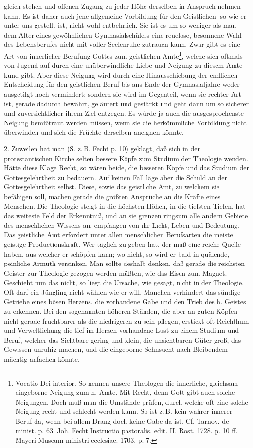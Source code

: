 gleich stehen und offenen Zugang zu jeder Höhe derselben in Anspruch nehmen kann. Es ist daher auch jene allgemeine Vorbildung für den Geistlichen, so wie er unter uns gestellt ist, nicht wohl entbehrlich. Sie ist es um so weniger als man dem Alter eines gewöhnlichen Gymnasialschülers eine reuelose, besonnene Wahl des Lebensberufes nicht mit voller Seelenruhe zutrauen kann. Zwar gibt es eine Art von innerlicher Berufung Gottes zum geistlichen Amte\footnote{Vocatio Dei interior. So nennen unsere Theologen die innerliche, gleichsam eingeborne Neigung zum h. Amte. Mit Recht, denn Gott gibt auch solche Neigungen. Doch muß man die Umstände prüfen, durch welche oft eine solche Neigung recht und schlecht werden kann. So ist z.\,B. kein wahrer innerer Beruf da, wenn bei allem Drang doch keine Gabe da ist. Cf. Tarnov. de minist. p. 63. Joh. Fecht Instructio pastoralis. edit. II. Rost. 1728. p. 10 ff. Mayeri Museum ministri ecclesiae. 1703. p. 7.}, welche sich oftmals von Jugend auf durch eine unüberwindliche Liebe und Neigung zu diesem Amte kund gibt. Aber diese Neigung wird durch eine Hinausschiebung der endlichen Entscheidung für den geistlichen Beruf bis ans Ende der Gymnasialjahre weder ausgetilgt noch vermindert; sondern sie wird im Gegenteil, wenn sie rechter Art ist, gerade dadurch bewährt, geläutert und gestärkt und geht dann um so sicherer und zuversichtlicher ihrem Ziel entgegen. Es würde ja auch die ausgesprochenste Neigung bemißtraut werden müssen, wenn sie die herkömmliche Vorbildung nicht überwinden und sich die Früchte derselben aneignen könnte.

2. Zuweilen hat man (S. z.\,B. Fecht p. 10) geklagt, daß sich in der protestantischen Kirche selten bessere Köpfe zum
Studium der Theologie wenden. Hätte diese Klage Recht, so wären beide, die besseren Köpfe und das Studium der Gottesgelehrtheit zu bedauern. Auf keinen Fall läge aber die Schuld an der Gottesgelehrtheit selbst. Diese, sowie das geistliche Amt, zu welchem sie befähigen soll, machen gerade die größten Ansprüche an die Kräfte eines Menschen. Die Theologie steigt in die höchsten Höhen, in die tiefsten Tiefen, hat das weiteste Feld der Erkenntniß, und an sie grenzen ringsum alle andern Gebiete des menschlichen Wissens an, empfangen von ihr Licht, Leben und Bedeutung. Das geistliche Amt erfordert unter allen menschlichen Berufsarten die meiste geistige Productionskraft. Wer täglich zu geben hat, der muß eine reiche Quelle haben, aus welcher er schöpfen kann; wo nicht, so wird er bald in quälende, peinliche Armuth versinken. Man sollte deshalb denken, daß gerade die reichsten Geister zur Theologie gezogen werden müßten, wie das Eisen zum Magnet. Geschieht nun das nicht, so liegt die Ursache, wie gesagt, nicht in der Theologie. Oft darf ein Jüngling nicht wählen wie er will. Manchen verhindert das sündige Getriebe eines bösen Herzens, die vorhandene Gabe und den Trieb des h. Geistes zu erkennen. Bei den sogenannten höheren Ständen, die aber an guten Köpfen nicht gerade fruchtbarer als die niedrigeren zu sein pflegen, erstickt oft Reichthum und Verweltlichung die tief im Herzen vorhandene Lust zu einem Studium und Beruf, welcher das Sichtbare gering und klein, die unsichtbaren Güter groß, das Gewissen unruhig machen, und die eingeborne Sehnsucht nach Bleibendem mächtig anfachen könnte.

